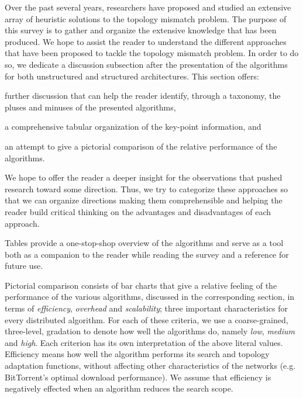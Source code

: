 Over the past several years, researchers have proposed and studied an extensive
array of heuristic solutions to the topology mismatch problem. The purpose of
this survey is to gather and organize the extensive knowledge that has been
produced. We hope to assist the reader to understand the different approaches
that have been proposed to tackle the topology mismatch problem. In order to do
so, we dedicate a discussion subsection after the presentation of the algorithms
for both unstructured and structured architectures. This section offers:
\begin{inparaenum}
  \item further discussion that can help the reader identify, through
a taxonomy, the pluses and minuses  of the presented algorithms,
  \item a comprehensive tabular organization of the key-point information, and
  \item an attempt to give a pictorial comparison of the relative performance of
the algorithms.
\end{inparaenum}

We hope to offer the reader a deeper insight for the observations that
pushed research toward some direction. Thus, we try to categorize these
approaches so that we can organize directions making them comprehensible
and helping the reader build critical thinking on the advantages and
disadvantages of each approach.

Tables provide a one-stop-shop overview of the algorithms and serve as a 
tool both as a companion to the reader while reading the survey and a reference for
future use.

Pictorial comparison consists of bar charts that give a relative feeling of the
performance of the various algorithms, discussed in the corresponding section,
in
terms of \emph{efficiency}, \emph{overhead} and \emph{scalability}; three
important characteristics for every distributed algorithm. For each of these
criteria, we use a
coarse-grained, three-level, gradation to denote how well the algorithms do,
namely \emph{low}, \emph{medium} and \emph{high}. Each criterion has its own
interpretation of the above literal values. Efficiency means how well the
algorithm performs its search and topology adaptation functions, without
affecting other characteristics of the networks (e.g. BitTorrent's optimal
download performance). We assume that efficiency is
negatively effected when an algorithm reduces the search scope. 

